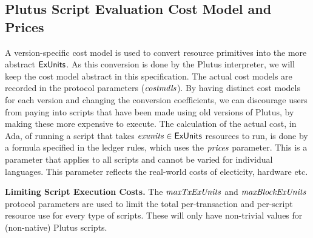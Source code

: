 \subsection{Plutus Script Evaluation Cost Model and Prices}
\label{sec:cost-mod}

A version-specific cost model is used to convert resource
primitives into the
more abstract $\mathsf{ExUnits}$. As this conversion is done by the Plutus interpreter,
we will keep the cost model abstract in this specification.
The actual cost models are recorded in the protocol
parameters ($\mathit{costmdls}$).
%
By having distinct cost models for each version and changing the conversion coefficients, we can discourage users from
paying into scripts that have been made using old versions of Plutus, by making these more expensive to execute.
%
The calculation of the actual cost, in Ada, of running
a script that takes $\mathit{exunits} \in \mathsf{ExUnits}$ resources to run,
is done by a formula specified in the ledger rules, which uses the
$\mathit{prices}$ parameter. This is a parameter that applies to all
scripts and cannot be varied for individual languages. This parameter
reflects the real-world costs of electicity, hardware etc.

\textbf{Limiting Script Execution Costs.}
The $\mathit{maxTxExUnits}$ and $\mathit{maxBlockExUnits}$  protocol parameters are
used to limit the total per-transaction and per-script resource use for every
type of scripts. These will only have non-trivial values for
(non-native) Plutus scripts.

